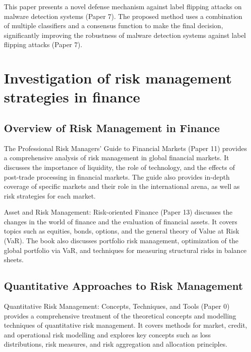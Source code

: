 \documentclass{article}
\begin{document}
This paper presents a novel defense mechanism against label flipping attacks on malware detection systems (Paper 7). The proposed method uses a combination of multiple classifiers and a consensus function to make the final decision, significantly improving the robustness of malware detection systems against label flipping attacks (Paper 7).






\clearpage
\section{Investigation of risk management strategies in finance}

\subsection{Overview of Risk Management in Finance}

The Professional Risk Managers' Guide to Financial Markets (Paper 11) provides a comprehensive analysis of risk management in global financial markets. It discusses the importance of liquidity, the role of technology, and the effects of post-trade processing in financial markets. The guide also provides in-depth coverage of specific markets and their role in the international arena, as well as risk strategies for each market.

Asset and Risk Management: Risk-oriented Finance (Paper 13) discusses the changes in the world of finance and the evaluation of financial assets. It covers topics such as equities, bonds, options, and the general theory of Value at Risk (VaR). The book also discusses portfolio risk management, optimization of the global portfolio via VaR, and techniques for measuring structural risks in balance sheets.

\subsection{Quantitative Approaches to Risk Management}

Quantitative Risk Management: Concepts, Techniques, and Tools (Paper 0) provides a comprehensive treatment of the theoretical concepts and modelling techniques of quantitative risk management. It covers methods for market, credit, and operational risk modelling and explores key concepts such as loss distributions, risk measures, and risk aggregation and allocation principles.
\end{document}
